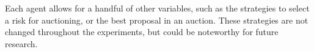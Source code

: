 Each agent allows for a handful of other variables, such as the strategies to select a risk for auctioning, or the best proposal in an auction. These strategies are not changed throughout the experiments, but could be noteworthy for future research.






